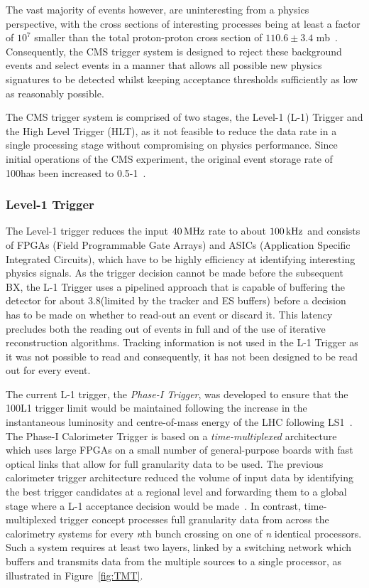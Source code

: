 The vast majority of events however, are uninteresting from a physics perspective, with the cross sections of interesting processes being at least a factor of $10^{7}$ smaller than the total proton-proton cross section of $110.6 \pm 3.4$ mb~\cite{Antchev:2017dia}.
Consequently, the CMS trigger system is designed to reject these background events and select events in a manner that allows all possible new physics signatures to be detected whilst keeping acceptance thresholds sufficiently as low as reasonably possible.

The CMS trigger system is comprised of two stages, the Level-1 (L-1) Trigger and the High Level Trigger (HLT), as it not feasible to reduce the data rate in a single processing stage without compromising on physics performance.
Since initial operations of the CMS experiment, the original event storage rate of 100\Hz has been increased to 0.5-1\kHz~\cite{Dasu:2000ge,phase1L1TDR}.

\subsubsection{Level-1 Trigger}\label{paragraph:L1}
The Level-1 trigger reduces the input $40\text{\,MHz}$ rate to about $100\text{\,kHz}$ and consists of FPGAs (Field Programmable Gate Arrays) and ASICs (Application Specific Integrated Circuits), which have to be highly efficiency at identifying interesting physics signals.
As the trigger decision cannot be made before the subsequent BX, the L-1 Trigger uses a pipelined approach that is capable of buffering the detector for about 3.8\mus (limited by the tracker and ES buffers) before a decision has to be made on whether to read-out an event or discard it. 
This latency precludes both the reading out of events in full and of the use of iterative reconstruction algorithms.
Tracking information is not used in the L-1 Trigger as it was not possible to read  and consequently, it has not been designed to be read out for every event.

The current L-1 trigger, the \emph{Phase-I Trigger}, was developed to ensure that the 100\kHz L1 trigger limit would be maintained following the increase in the instantaneous luminosity and centre-of-mass energy of the LHC following LS1~\cite{phase1L1TDR}.
The Phase-I Calorimeter Trigger is based on a \emph{time-multiplexed} architecture which uses large FPGAs on a small number of general-purpose boards with fast optical links that allow for full granularity data to be used.
The previous calorimeter trigger architecture reduced the volume of input data by identifying the best trigger candidates at a regional level and forwarding them to a global stage where a L-1 acceptance decision would be made~\cite{phase1L1TDR}.
In contrast, time-multiplexed trigger concept processes full granularity data from across the calorimetry systems for every \emph{n}th bunch crossing on one of \emph{n} identical processors.
Such a system requires at least two layers, linked by a switching network which buffers and transmits data from the multiple sources to a single processor, as illustrated in Figure~\ref{fig:TMT}.

